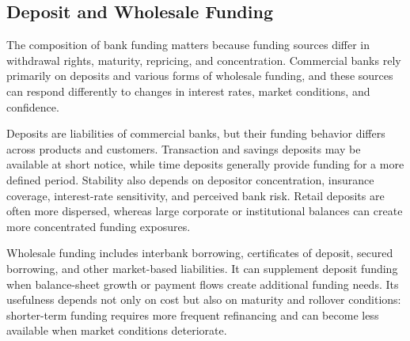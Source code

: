 \subsection{Deposit and Wholesale Funding}

The composition of bank funding matters because funding sources differ in withdrawal rights, maturity, repricing, and concentration. Commercial banks rely primarily on deposits and various forms of wholesale funding, and these sources can respond differently to changes in interest rates, market conditions, and confidence.

Deposits are liabilities of commercial banks, but their funding behavior differs across products and customers. Transaction and savings deposits may be available at short notice, while time deposits generally provide funding for a more defined period. Stability also depends on depositor concentration, insurance coverage, interest-rate sensitivity, and perceived bank risk. Retail deposits are often more dispersed, whereas large corporate or institutional balances can create more concentrated funding exposures.

Wholesale funding includes interbank borrowing, certificates of deposit, secured borrowing, and other market-based liabilities. It can supplement deposit funding when balance-sheet growth or payment flows create additional funding needs. Its usefulness depends not only on cost but also on maturity and rollover conditions: shorter-term funding requires more frequent refinancing and can become less available when market conditions deteriorate.

